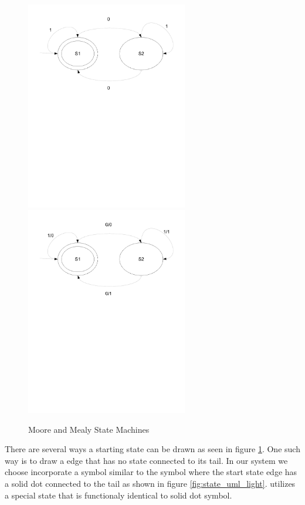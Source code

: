 \begin{figure}[htp]
    \centering
    \includegraphics[trim= 15mm 150mm 15mm 10mm, clip, width=200pt]{./images/state_moore.pdf} 
    \includegraphics[trim= 15mm 150mm 15mm 10mm, clip, width=200pt]{./images/state_mealy.pdf}    
    \caption{Moore and Mealy State Machines}
    \label{fig:state_moore_mealy}
\end{figure}

There are several ways a starting state can be drawn as seen in figure \ref{fig:state_moore_mealy}.
One such way is to draw a edge that has no state connected to its tail. In our system we choose incorporate a symbol similar to  the \cite{UML2} symbol where the start state edge has a solid dot connected to the tail as shown in figure \ref{fig:state_uml_light}. {\plccharts} utilizes a special  state that is functionaly identical to  solid dot symbol.

